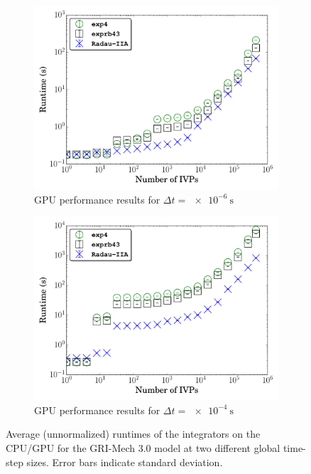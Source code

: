 \documentclass[preprint,review,11pt]{elsarticle}
\begin{document}
\begin{figure}[htbp]
\begin{subfigure}{0.49\textwidth}
      \includegraphics[width=\linewidth]{CH4_1e-06_gpu_nonorm.pdf}
      \caption{GPU performance results for $\Delta t = \SI{e-6}{\second}$}
  \end{subfigure}
  \begin{subfigure}{0.49\textwidth}
      \includegraphics[width=\linewidth]{CH4_1e-04_gpu_nonorm.pdf}
      \caption{GPU performance results for $\Delta t = \SI{e-4}{\second}$}
  \end{subfigure}
  \caption{Average (unnormalized) runtimes of the integrators on the CPU\slash GPU for the GRI-Mech 3.0 model at two different global time-step sizes.
  Error bars indicate standard deviation.}
  \label{F:raw_perf_CH4}
\end{figure}
\end{document}
